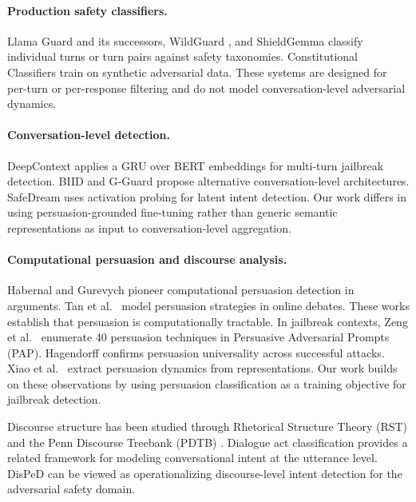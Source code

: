 \documentclass[11pt,a4paper]{article}
\newcommand{\ours}{DisPeD}
\begin{document}
\paragraph{Production safety classifiers.}
Llama Guard \cite{llamaguard2024} and its successors, WildGuard \cite{wildguard2024}, and ShieldGemma \cite{shieldgemma2024} classify individual turns or turn pairs against safety taxonomies. Constitutional Classifiers \cite{anthropic2024constitutional} train on synthetic adversarial data. These systems are designed for per-turn or per-response filtering and do not model conversation-level adversarial dynamics.

\paragraph{Conversation-level detection.}
DeepContext \cite{su2026deepcontext} applies a GRU over BERT embeddings for multi-turn jailbreak detection. BIID \cite{biid2025} and G-Guard \cite{gguard2025} propose alternative conversation-level architectures. SafeDream \cite{safedream2025} uses activation probing for latent intent detection. Our work differs in using persuasion-grounded fine-tuning rather than generic semantic representations as input to conversation-level aggregation.

\paragraph{Computational persuasion and discourse analysis.}
Habernal and Gurevych \cite{habernal2016} pioneer computational persuasion detection in arguments. Tan et al.~\cite{tan2016winning} model persuasion strategies in online debates. These works establish that persuasion is computationally tractable. In jailbreak contexts, Zeng et al.~\cite{zeng2024pap} enumerate 40 persuasion techniques in Persuasive Adversarial Prompts (PAP). Hagendorff \cite{hagendorff2026} confirms persuasion universality across successful attacks. Xiao et al.~\cite{xiao2025howdollms} extract persuasion dynamics from representations. Our work builds on these observations by using persuasion classification as a training objective for jailbreak detection.

Discourse structure has been studied through Rhetorical Structure Theory (RST) \cite{mann1988rst} and the Penn Discourse Treebank (PDTB) \cite{pdtb2008}. Dialogue act classification \cite{stolcke2000dialogue} provides a related framework for modeling conversational intent at the utterance level. \ours{} can be viewed as operationalizing discourse-level intent detection for the adversarial safety domain.
\end{document}
